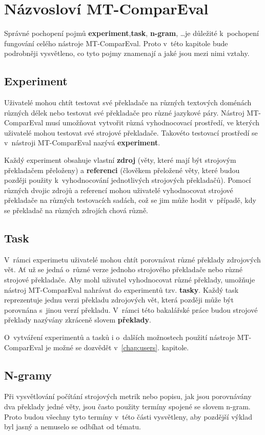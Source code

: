 \chapter{Názvosloví MT-ComparEval}
\label{chap:experiments}

Správné pochopení pojmů \textbf{experiment},\textbf{task}, \textbf{\mbox{n-gram}}, \dots je důležité k~pochopení fungování celého nástroje MT-ComparEval.
Proto v~této kapitole bude podrobněji vysvětleno,
  co tyto pojmy znamenají a jaké jsou mezi nimi vztahy.

\section{Experiment}
Uživatelé mohou chtít testovat své překladače na různých textových doménách různých délek
  nebo testovat své překladače pro různé jazykové páry.
Nástroj MT-ComparEval musí umožňovat vytvořit různá vyhodnocovací prostředí,
  ve kterých uživatelé mohou testovat své strojové překladače.
Takovéto testovací prostředí se v~nástroji MT-ComparEval nazývá \textbf{experiment}.

Každý experiment obsahuje vlastní \textbf{zdroj} (věty, které mají být strojovým překladačem přeloženy) a
  \textbf{referenci} (člověkem přeložené věty, které budou později použity k~vyhodnocování jednotlivých strojových překladačů).
Pomocí různých dvojic zdrojů a referencí mohou uživatelé vyhodnocovat strojové překladače na různých testovacích sadách,
  což se jim může hodit v~případě,
  kdy se překladač na různých zdrojích chová různě.

\section{Task}
V~rámci experimetu uživatelé mohou chtít porovnávat různé překlady zdrojových vět.
Ať už se jedná o~různé verze jednoho strojového překladače nebo různé strojové překladače.
Aby mohl uživatel vyhodnocovat různé překlady,
  umožňuje nástroj MT-ComparEval nahrávat do experimentů tzv. \textbf{tasky}.
Každý task reprezentuje jednu verzi překladu zdrojových vět,
  která později může být porovnána s~jinou verzí překladu.
V~rámci této bakalářské práce budou strojové překlady nazývány zkráceně slovem \textbf{překlady}.

O~vytváření experimentů a tasků i o~dalších možnostech použití nástroje MT-ComparEval je možné se dozvědět v~\ref{chap:users}. kapitole.

\section{N-gramy}
Při vysvětlování počítání strojových metrik
  nebo popisu, jak jsou porovnávány dva překlady jedné věty,
  jsou často použity termíny spojené se slovem \mbox{n-gram}.
Proto budou všechny tyto termíny v~této části vysvětleny,
  aby pozdější výklad byl jasný a nemuselo se odbíhat od tématu.

